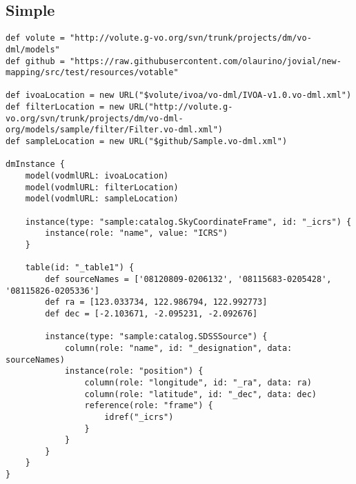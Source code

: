 \documentclass[11pt,a4paper]{ivoa}
\begin{document}
\subsection{Simple}
\begin{lstlisting}[label=lst:simple,caption=Example VO-DSL listing,frame=tb]
def volute = "http://volute.g-vo.org/svn/trunk/projects/dm/vo-dml/models"
def github = "https://raw.githubusercontent.com/olaurino/jovial/new-mapping/src/test/resources/votable"

def ivoaLocation = new URL("$volute/ivoa/vo-dml/IVOA-v1.0.vo-dml.xml")
def filterLocation = new URL("http://volute.g-vo.org/svn/trunk/projects/dm/vo-dml-org/models/sample/filter/Filter.vo-dml.xml")
def sampleLocation = new URL("$github/Sample.vo-dml.xml")

dmInstance {
    model(vodmlURL: ivoaLocation)
    model(vodmlURL: filterLocation)
    model(vodmlURL: sampleLocation)

    instance(type: "sample:catalog.SkyCoordinateFrame", id: "_icrs") {
        instance(role: "name", value: "ICRS")
    }

    table(id: "_table1") {
        def sourceNames = ['08120809-0206132', '08115683-0205428', '08115826-0205336']
        def ra = [123.033734, 122.986794, 122.992773]
        def dec = [-2.103671, -2.095231, -2.092676]

        instance(type: "sample:catalog.SDSSSource") {
            column(role: "name", id: "_designation", data: sourceNames)
            instance(role: "position") {
                column(role: "longitude", id: "_ra", data: ra)
                column(role: "latitude", id: "_dec", data: dec)
                reference(role: "frame") {
                    idref("_icrs")
                }
            }
        }
    }
}
\end{lstlisting}
\end{document}
